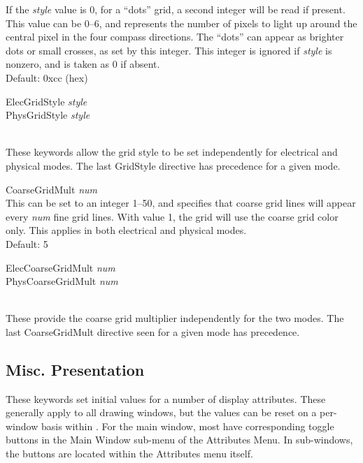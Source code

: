 \begin{description}
If the {\it style} value is 0, for a ``dots'' grid, a second integer
will be read if present.  This value can be 0--6, and represents the
number of pixels to light up around the central pixel in the four
compass directions.  The ``dots'' can appear as brighter dots or small
crosses, as set by this integer.  This integer is ignored if {\it
style} is nonzero, and is taken as 0 if absent.\\
Default: 0xcc (hex)

\item\parbox[b]{4in}{\vt
ElecGridStyle {\it style}\\
PhysGridStyle {\it style}}\\
These keywords allow the grid style to be set independently for
electrical and physical modes.  The last {\vt GridStyle} directive has
precedence for a given mode.

\item{\vt CoarseGridMult} {\it num}\\
This can be set to an integer 1--50, and specifies that coarse grid
lines will appear every {\it num} fine grid lines.  With value 1, the
grid will use the coarse grid color only.  This applies in both
electrical and physical modes.\\
Default: 5

\item\parbox[b]{4in}{{\vt ElecCoarseGridMult} {\it num}\\
{\vt PhysCoarseGridMult} {\it num}}\\
These provide the coarse grid multiplier independently for the two
modes.  The last {\vt CoarseGridMult} directive seen for a given mode
has precedence.
\end{description}


\subsection{Misc. Presentation}

These keywords set initial values for a number of display attributes. 
These generally apply to all drawing windows, but the values can be
reset on a per-window basis within {\Xic}.  For the main window, most
have corresponding toggle buttons in the {\cb Main Window} sub-menu of
the {\cb Attributes Menu}.  In sub-windows, the buttons are located
within the {\cb Attributes} menu itself.

